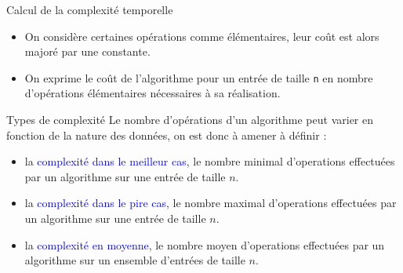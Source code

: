 \documentclass[10pt]{beamer}
\begin{document}
\begin{frame}[fragile]{\Ctitle}{\stitle}
    \begin{alertblock}{Calcul de la complexité temporelle}
        \begin{itemize}
            \item<1-> On considère certaines opérations comme élémentaires, leur coût est alors majoré par une constante.\\
            \item<3-> On exprime le coût de l'algorithme pour un entrée de taille {\tt n} en nombre d'opérations élémentaires nécessaires à sa réalisation.
        \end{itemize}
    \end{alertblock}
\end{frame}

\begin{frame}[fragile]{\Ctitle}{\stitle}
    \begin{alertblock}{Types de complexité}
    Le nombre d'opérations d'un algorithme peut varier en fonction de la nature des données, on est donc à amener à définir :
        \begin{itemize}
            \item<4-> la \textcolor{blue}{complexité dans le meilleur cas}, le nombre minimal d'operations effectuées par un algorithme sur une entrée de taille $n$.
            \item<5-> la \textcolor{blue}{complexité dans le pire cas}, le nombre maximal d'operations effectuées par un algorithme sur une entrée de taille $n$.
            \item<6-> la \textcolor{blue}{complexité en moyenne}, le nombre moyen d'operations effectuées par un algorithme sur un ensemble d'entrées de taille $n$.
        \end{itemize}
    \end{alertblock}
\end{frame} 
\end{document}

